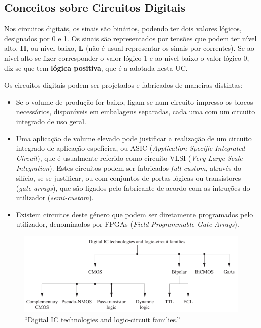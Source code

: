 \subsection[5.2 Conceitos sobre Circuitos Digitais]{\hspace*{0.075 em}\raisebox{0.2 em}{$\pmb{\drsh}$} Conceitos sobre Circuitos Digitais}

Nos circuitos digitais, os sinais são binários, podendo ter dois valores lógicos, designados por 0 e 1. Os sinais são representados por tensões que podem ter nível alto, \textbf{H}, ou nível baixo, \textbf{L} (não é usual representar os sinais por correntes). Se ao nível alto se fizer corresponder o valor lógico 1 e ao nível baixo o valor lógico 0, diz-se que tem \textbf{lógica positiva}, que é a adotada nesta UC.

\begin{mdframed}
    \noindent Os circuitos digitais podem ser projetados e fabricados de maneiras distintas:
    \begin{itemize}[leftmargin=*, label=\rule{0.9ex}{0.9ex}]
        \item Se o volume de produção for baixo, ligam-se num circuito impresso os blocos necessários, disponíveis em embalagens separadas, cada uma com um circuito integrado de uso geral.
        
        \item Uma aplicação de volume elevado pode justificar a realização de um circuito integrado de aplicação espefícica, ou ASIC (\textit{Application Specific Integrated Circuit}), que é usualmente referido como circuito VLSI (\textit{Very Large Scale Integration}). Estes circuitos podem ser fabricados \textit{full-custom}, através do silício, se se justificar, ou com conjuntos de portas lógicas ou transístores (\textit{gate-arrays}), que são ligados pelo fabricante de acordo com as intruções do utilizador (\textit{semi-custom}).

        \item Existem circuitos deste género que podem ser diretamente programados pelo utilizador, denominados por FPGAs (\textit{Field Programmable Gate Arrays}).
    \end{itemize}
\end{mdframed}

\vspace{-1.0em}
\begin{figure}[H]
    \centering
    \includegraphics[width=0.6\linewidth]{img/5/logic-families.png}
    \caption{``Digital IC technologies and logic-circuit families.''\cite{sedra-smith:microelectronic-circuits}}
    \label{fig:logic-families}
\end{figure}


